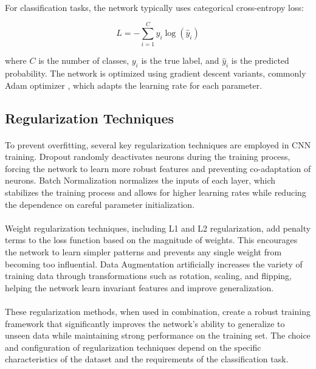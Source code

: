 \paragraph{}
For classification tasks, the network typically uses categorical cross-entropy loss:

\[
L = -\sum_{i=1}^{C} y_i \log(\hat{y}_i)
\]

where $C$ is the number of classes, $y_i$ is the true label, and $\hat{y}_i$ is the predicted probability. The network is optimized using gradient descent variants, commonly Adam optimizer \cite{kingma2014adam}, which adapts the learning rate for each parameter.

\subsection{Regularization Techniques}
\label{subsec:regularization}

\paragraph{}
To prevent overfitting, several key regularization techniques are employed in CNN training. Dropout \cite{srivastava2014dropout} randomly deactivates neurons during the training process, forcing the network to learn more robust features and preventing co-adaptation of neurons. Batch Normalization \cite{ioffe2015batch} normalizes the inputs of each layer, which stabilizes the training process and allows for higher learning rates while reducing the dependence on careful parameter initialization.

\paragraph{}
Weight regularization techniques, including L1 and L2 regularization, add penalty terms to the loss function based on the magnitude of weights. This encourages the network to learn simpler patterns and prevents any single weight from becoming too influential. Data Augmentation \cite{shorten2019survey} artificially increases the variety of training data through transformations such as rotation, scaling, and flipping, helping the network learn invariant features and improve generalization.

\paragraph{}
These regularization methods, when used in combination, create a robust training framework that significantly improves the network's ability to generalize to unseen data while maintaining strong performance on the training set. The choice and configuration of regularization techniques depend on the specific characteristics of the dataset and the requirements of the classification task.

